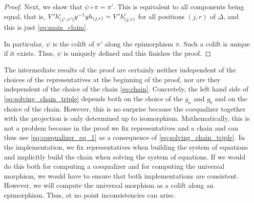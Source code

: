 \begin{proof}
Next, we show that $\psi \circ \pi = \pi'$. This is equivalent to all components being equal, that is, $V' h'_{(j',r')} g^{-1} g h_{(j,r)} = V' h'_{(j,r)}$ for all positions $(j,r)$ of $\Delta$, and this is just \eqref{eq:main_claim}.

In particular, $\psi$ is the colift of $\pi'$ along the epimorphism $\pi$. Such a colift is unique if it exists. Thus, $\psi$ is uniquely defined and this finishes the proof.
\end{proof}

\begin{rem}\label{rem:consistent_choices}
The intermediate results of the proof are certainly neither independent of the choices of the representatives at the beginning of the proof, nor are they independent of the choice of the chain \eqref{eq:chain}. Concretely, the left hand side of \eqref{eq:solving_chain_triple} depends both on the choice of the $g_a$ and $g_b$ and on the choice of the chain. However, this is no surprise because the coequalizer together with the projection is only determined up to isomorphism. Mathematically, this is not a problem because in the proof we fix representatives and a chain and can thus use \eqref{eq:coequalizer_eq_1} as a consequence of \eqref{eq:solving_chain_triple}. In the implementation, we fix representatives when building the system of equations and implicitly build the chain when solving the system of equations. If we would do this both for computing a coequalizer and for computing the universal morphism, we would have to ensure that both implementations are consistent. However, we will compute the universal morphism as a colift along an epimorphism. Thus, at no point inconsistencies can arise.
\end{rem}

